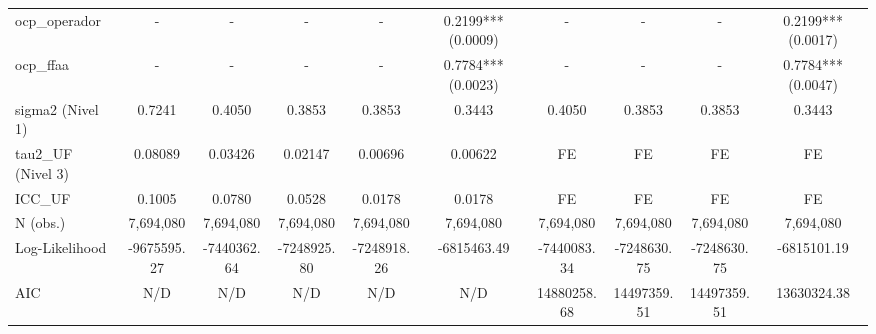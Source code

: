 \begin{table}
\begin{tabular}{lccccccccc}
ocp_operador & - & - & - & - & 0.2199*** (0.0009) & - & - & - & 0.2199*** (0.0017) \\
ocp_ffaa & - & - & - & - & 0.7784*** (0.0023) & - & - & - & 0.7784*** (0.0047) \\
sigma2 (Nivel 1) & 0.7241 & 0.4050 & 0.3853 & 0.3853 & 0.3443 & 0.4050 & 0.3853 & 0.3853 & 0.3443 \\
tau2_UF (Nivel 3) & 0.08089 & 0.03426 & 0.02147 & 0.00696 & 0.00622 & FE & FE & FE & FE \\
ICC_UF & 0.1005 & 0.0780 & 0.0528 & 0.0178 & 0.0178 & FE & FE & FE & FE \\
N (obs.) & 7,694,080 & 7,694,080 & 7,694,080 & 7,694,080 & 7,694,080 & 7,694,080 & 7,694,080 & 7,694,080 & 7,694,080 \\
Log-Likelihood & -9675595.27 & -7440362.64 & -7248925.80 & -7248918.26 & -6815463.49 & -7440083.34 & -7248630.75 & -7248630.75 & -6815101.19 \\
AIC & N/D & N/D & N/D & N/D & N/D & 14880258.68 & 14497359.51 & 14497359.51 & 13630324.38 \\
\bottomrule
\end{tabular}
\end{table}
